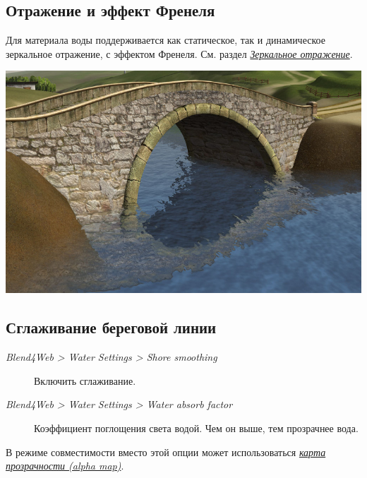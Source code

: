 \documentclass[a4paper,12pt,oneside]{sphinxmanual}
\begin{document}
\subsection{Отражение и эффект Френеля}
\label{outdoor_rendering:id7}
Для материала воды поддерживается как статическое, так и динамическое зеркальное отражение, с эффектом Френеля. См. раздел {\hyperref[materials:material-mirror]{\emph{Зеркальное отражение}}}.

{\hfill\includegraphics[width=1.000\linewidth]{water_reflection_dynamic.jpg}\hfill}


\subsection{Сглаживание береговой линии}
\label{outdoor_rendering:id8}\begin{description}
\item[{\emph{Blend4Web \textgreater{} Water Settings \textgreater{} Shore smoothing}}] \leavevmode
Включить сглаживание.

\item[{\emph{Blend4Web \textgreater{} Water Settings \textgreater{} Water absorb factor}}] \leavevmode
Коэффициент поглощения света водой. Чем он выше, тем прозрачнее вода.

\end{description}

В режиме совместимости вместо этой опции может использоваться {\hyperref[textures:texture-alpha-map]{\emph{карта прозрачности (alpha map)}}}.
\end{document}
